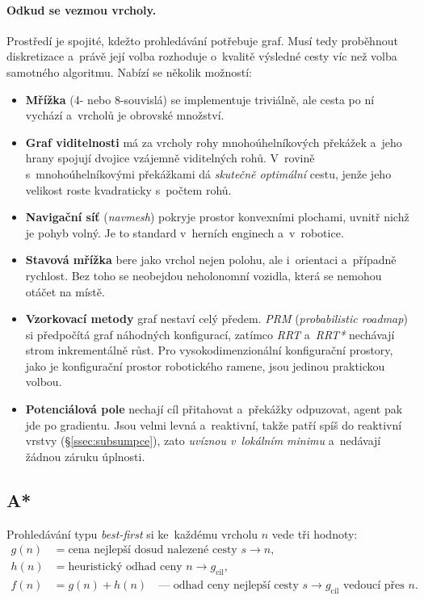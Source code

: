 \documentclass[11pt,a4paper]{article}
\theoremstyle{definition}
\begin{document}
\paragraph{Odkud se vezmou vrcholy.} Prostředí je spojité, kdežto prohledávání potřebuje graf.
Musí tedy proběhnout diskretizace a~právě její volba rozhoduje o~kvalitě výsledné cesty víc než
volba samotného algoritmu. Nabízí se několik možností:
\begin{itemize}
\item \textbf{Mřížka} (4- nebo 8-souvislá) se implementuje triviálně, ale cesta po ní vychází
   a~vrcholů je obrovské množství.
\item \textbf{Graf viditelnosti} má za vrcholy rohy mnohoúhelníkových překážek a~jeho hrany
  spojují dvojice vzájemně viditelných rohů. V~rovině s~mnohoúhelníkovými překážkami dá
  \emph{skutečně optimální} cestu, jenže jeho velikost roste kvadraticky s~počtem rohů.
\item \textbf{Navigační síť} (\emph{navmesh}) pokryje prostor konvexními plochami, uvnitř nichž
  je pohyb volný. Je to standard v~herních enginech a~v~robotice.
\item \textbf{Stavová mřížka} bere jako vrchol nejen polohu, ale i~orientaci a~případně
  rychlost. Bez toho se neobejdou neholonomní vozidla, která se nemohou otáčet na místě.
\item \textbf{Vzorkovací metody} graf nestaví celý předem.
  \emph{PRM} (\emph{probabilistic roadmap}) si předpočítá graf náhodných konfigurací,
  zatímco \emph{RRT} a~\emph{RRT*} nechávají strom inkrementálně růst. Pro vysokodimenzionální
  konfigurační prostory, jako je konfigurační prostor robotického ramene, jsou jedinou
  praktickou volbou.
\item \textbf{Potenciálová pole} nechají cíl přitahovat a~překážky odpuzovat, agent pak jde
  po gradientu. Jsou velmi levná a~reaktivní, takže patří spíš do reaktivní vrstvy
  (\S\ref{ssec:subsumpce}), zato \emph{uvíznou v~lokálním minimu} a~nedávají žádnou záruku
  úplnosti.
\end{itemize}

\subsection{A*}

Prohledávání typu \emph{best-first} si ke~každému vrcholu $n$ vede tři hodnoty:
\begin{align*}
g(n) &= \text{cena nejlepší dosud nalezené cesty } s \to n, \\
h(n) &= \text{heuristický odhad ceny } n \to g_{\mathrm{cil}}, \\
f(n) &= g(n) + h(n) \quad \text{--- odhad ceny nejlepší cesty } s \to g_{\mathrm{cil}}
  \text{ vedoucí přes } n .
\end{align*}
\end{document}
